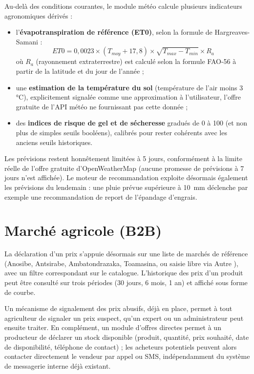 \documentclass[12pt,a4paper]{report}
\begin{document}
Au-delà des conditions courantes, le module météo calcule plusieurs indicateurs agronomiques dérivés :
\begin{itemize}
    \item l'\textbf{évapotranspiration de référence (ET0)}, selon la formule de Hargreaves-Samani :
    \[
    ET0 = 0{,}0023 \times (T_{moy} + 17{,}8) \times \sqrt{T_{max} - T_{min}} \times R_a
    \]
    où $R_a$ (rayonnement extraterrestre) est calculé selon la formule FAO-56 à partir de la latitude et du jour de l'année ;
    \item une \textbf{estimation de la température du sol} (température de l'air moins 3\,°C), explicitement signalée comme une approximation à l'utilisateur, l'offre gratuite de l'API météo ne fournissant pas cette donnée ;
    \item des \textbf{indices de risque de gel et de sécheresse} gradués de 0 à 100 (et non plus de simples seuils booléens), calibrés pour rester cohérents avec les anciens seuils historiques.
\end{itemize}

Les prévisions restent honnêtement limitées à 5 jours, conformément à la limite réelle de l'offre gratuite d'OpenWeatherMap (aucune promesse de prévisions à 7 jours n'est affichée). Le moteur de recommandation exploite désormais également les prévisions du lendemain : une pluie prévue supérieure à 10~mm déclenche par exemple une recommandation de report de l'épandage d'engrais.

\section{Marché agricole (B2B)}

La déclaration d'un prix s'appuie désormais sur une liste de marchés de référence (Anosibe, Antsirabe, Ambatondrazaka, Toamasina, ou saisie libre via \og Autre \fg{}), avec un filtre correspondant sur le catalogue. L'historique des prix d'un produit peut être consulté sur trois périodes (30 jours, 6 mois, 1 an) et affiché sous forme de courbe.

Un mécanisme de signalement des prix abusifs, déjà en place, permet à tout agriculteur de signaler un prix suspect, qu'un expert ou un administrateur peut ensuite traiter. En complément, un module d'\og offres directes \fg{} permet à un producteur de déclarer un stock disponible (produit, quantité, prix souhaité, date de disponibilité, téléphone de contact) ; les acheteurs potentiels peuvent alors contacter directement le vendeur par appel ou SMS, indépendamment du système de messagerie interne déjà existant.
\end{document}
